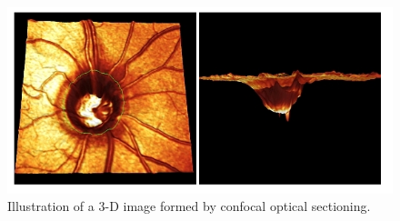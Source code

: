 \begin{figure}[H]
\centering
\includegraphics{figures/3dcslo}
\caption{Illustration of a 3-D image formed by confocal optical sectioning.\cite{sharp2004scanning}}
\label{fig:3d}
\end{figure}
